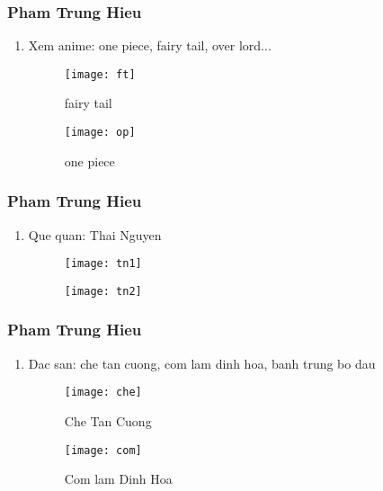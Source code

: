 \documentclass[12pt]{beamer}
\begin{document}
\begin{frame}
\frametitle{Pham Trung Hieu}

\begin{enumerate}[+]
\item Xem anime: one piece, fairy tail, over lord...
\begin{figure}
\begin{minipage}{0.4\textwidth}\centerline{\texttt{[image: ft]}}
\caption{fairy tail}
\end{minipage}
\begin{minipage}{0.5\textwidth}\centerline{\texttt{[image: op]}}
\caption{one piece}
\end{minipage}
\end{figure}

\end{enumerate}
\end{frame}
\begin{frame}
\frametitle{Pham Trung Hieu}
\begin{enumerate}[9]
\item Que quan: Thai Nguyen
\begin{figure}
\begin{minipage}{0.4\textwidth}\centerline{\texttt{[image: tn1]}}

\end{minipage}
\begin{minipage}{0.5\textwidth}\centerline{\texttt{[image: tn2]}}

\end{minipage}
\end{figure}

\end{enumerate}
\end{frame}
\begin{frame}
\frametitle{Pham Trung Hieu}
\begin{enumerate}[+]
\item Dac san: che tan cuong, com lam dinh hoa, banh trung bo dau
\begin{figure}
\begin{minipage}{0.4\textwidth}\centerline{\texttt{[image: che]}}
\caption{Che Tan Cuong}
\end{minipage}
\begin{minipage}{0.5\textwidth}\centerline{\texttt{[image: com]}}
\caption{Com lam Dinh Hoa}
\end{minipage}
\end{figure}

\end{enumerate}
\end{frame}
\end{document}

